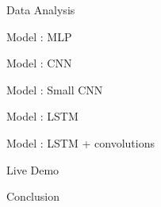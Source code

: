 \documentclass{beamer}
\begin{document}
	\begin{frame}{Data Analysis} 

	\end{frame}
	
	\begin{frame}{Model : MLP}

	\end{frame}

	\begin{frame}{Model : CNN}

	\end{frame}
	\begin{frame}{Model : Small CNN}

	\end{frame}	
	
	\begin{frame}{Model : LSTM}

	\end{frame}	
	
	\begin{frame}{Model : LSTM + convolutions}

	\end{frame}

	\begin{frame}{Live Demo}

	\end{frame}	
	
	\begin{frame}{Conclusion}

	\end{frame}		
\end{document}
